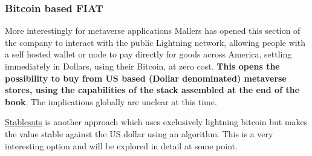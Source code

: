 \subsubsection{Bitcoin based FIAT}
More interestingly for metaverse applications Mallers has opened this section of the company to interact with the public Lightning network, allowing people with a self hosted wallet or node to pay directly for goods across America, settling immediately in Dollars, using their Bitcoin, at zero cost. \textbf{This opens the possibility to buy from US based (Dollar denominated) metaverse stores, using the capabilities of the stack assembled at the end of the book}. The implications globally are unclear at this time.\par
\href{https://stablesats.com/}{Stablesats} is another approach which uses exclusively lightning bitcoin but makes the value stable against the US dollar using an algorithm. This is a very interesting option and will be explored in detail at some point.
